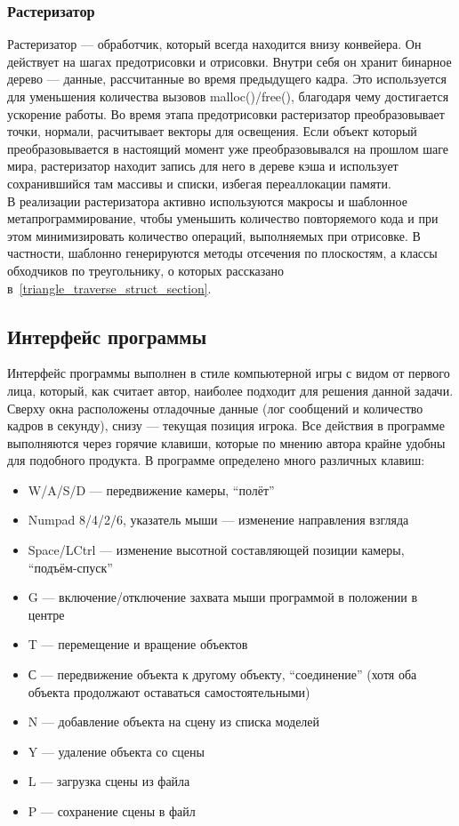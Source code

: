 \documentclass[a4paper,12pt]{report}
\numberwithin{equation}{section}
\begin{document}
\subsubsection{Растеризатор}
Растеризатор --- обработчик, который всегда находится внизу конвейера. Он действует на шагах предотрисовки и отрисовки. Внутри себя он хранит бинарное дерево --- данные, рассчитанные во время предыдущего кадра. Это используется для уменьшения количества вызовов malloc()/free(), благодаря чему достигается ускорение работы. Во время этапа предотрисовки растеризатор преобразовывает точки, нормали, расчитывает векторы для освещения. Если объект который преобразовывается в настоящий момент уже преобразовывался на прошлом шаге мира, растеризатор находит запись для него в дереве кэша и использует сохранившийся там массивы и списки, избегая переаллокации памяти. \\
В реализации растеризатора активно используются макросы и шаблонное метапрограммирование, чтобы уменьшить количество повторяемого кода и при этом минимизировать количество операций, выполняемых при отрисовке. В частности, шаблонно генерируются методы отсечения по плоскостям, а классы обходчиков по треугольнику, о которых рассказано в~\ref{triangle_traverse_struct_section}.

\subsection{Интерфейс программы}
Интерфейс программы выполнен в стиле компьютерной игры с видом от первого лица, который, как считает автор, наиболее подходит для решения данной задачи. Сверху окна расположены отладочные данные (лог сообщений и количество кадров в секунду), снизу --- текущая позиция игрока. Все действия в программе выполняются через горячие клавиши, которые по мнению автора крайне удобны для подобного продукта. В программе определено много различных клавиш:
\begin{itemize}
\item W/A/S/D --- передвижение камеры, ``полёт''
\item Numpad 8/4/2/6, указатель мыши --- изменение направления взгляда
\item Space/LCtrl --- изменение высотной составляющей позиции камеры, ``подъём-спуск''
\item G --- включение/отключение захвата мыши программой в положении в центре
\item T --- перемещение и вращение объектов
\item С --- передвижение объекта к другому объекту, ``соединение'' (хотя оба объекта продолжают оставаться самостоятельными)
\item N --- добавление объекта на сцену из списка моделей
\item Y --- удаление объекта со сцены
\item L --- загрузка сцены из файла
\item P --- сохранение сцены в файл
\end{itemize}
\end{document}
